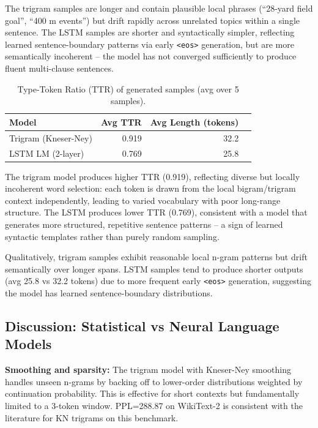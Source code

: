 \documentclass[11pt,a4paper]{article}
\begin{document}
The trigram samples are longer and contain plausible local phrases (``28-yard field goal'', ``400 m events'') but drift rapidly across unrelated topics within a single sentence. The LSTM samples are shorter and syntactically simpler, reflecting learned sentence-boundary patterns via early \texttt{<eos>} generation, but are more semantically incoherent -- the model has not converged sufficiently to produce fluent multi-clause sentences.

\begin{table}[H]
\centering
\caption{Type-Token Ratio (TTR) of generated samples (avg over 5 samples).}
\label{tab:q5ttr}
\begin{tabular}{lrrr}
\toprule
Model & Avg TTR & Avg Length (tokens) \\
\midrule
Trigram (Kneser-Ney) & 0.919 & 32.2 \\
LSTM LM (2-layer)    & 0.769 & 25.8 \\
\bottomrule
\end{tabular}
\end{table}

The trigram model produces higher TTR (0.919), reflecting diverse but locally incoherent word selection: each token is drawn from the local bigram/trigram context independently, leading to varied vocabulary with poor long-range structure. The LSTM produces lower TTR (0.769), consistent with a model that generates more structured, repetitive sentence patterns -- a sign of learned syntactic templates rather than purely random sampling.

Qualitatively, trigram samples exhibit reasonable local n-gram patterns but drift semantically over longer spans. LSTM samples tend to produce shorter outputs (avg 25.8 vs 32.2 tokens) due to more frequent early \texttt{<eos>} generation, suggesting the model has learned sentence-boundary distributions.

\subsection{Discussion: Statistical vs Neural Language Models}

\textbf{Smoothing and sparsity:} The trigram model with Kneser-Ney smoothing handles unseen n-grams by backing off to lower-order distributions weighted by continuation probability. This is effective for short contexts but fundamentally limited to a 3-token window. PPL=288.87 on WikiText-2 is consistent with the literature for KN trigrams on this benchmark.
\end{document}
